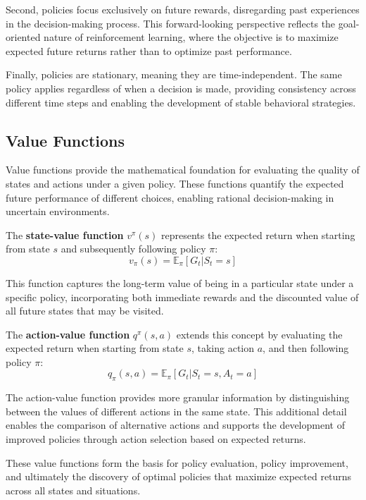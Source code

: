 Second, policies focus exclusively on future rewards, disregarding past experiences in the decision-making process. This forward-looking perspective reflects the goal-oriented nature of reinforcement learning, where the objective is to maximize expected future returns rather than to optimize past performance.

Finally, policies are stationary, meaning they are time-independent. The same policy applies regardless of when a decision is made, providing consistency across different time steps and enabling the development of stable behavioral strategies.


\subsection{Value Functions}


Value functions provide the mathematical foundation for evaluating the quality of states and actions under a given policy. These functions quantify the expected future performance of different choices, enabling rational decision-making in uncertain environments.

The \textbf{state-value function} $v^\pi(s)$ represents the expected return when starting from state $s$ and subsequently following policy $\pi$:
\begin{equation}
v_\pi(s) = \mathbb{E}_\pi[G_t | S_t = s]
\end{equation}

This function captures the long-term value of being in a particular state under a specific policy, incorporating both immediate rewards and the discounted value of all future states that may be visited.

The \textbf{action-value function} $q^\pi(s,a)$ extends this concept by evaluating the expected return when starting from state $s$, taking action $a$, and then following policy $\pi$:
\begin{equation}
q_\pi(s,a) = \mathbb{E}_\pi[G_t | S_t = s, A_t = a]
\end{equation}

The action-value function provides more granular information by distinguishing between the values of different actions in the same state. This additional detail enables the comparison of alternative actions and supports the development of improved policies through action selection based on expected returns.

These value functions form the basis for policy evaluation, policy improvement, and ultimately the discovery of optimal policies that maximize expected returns across all states and situations.

